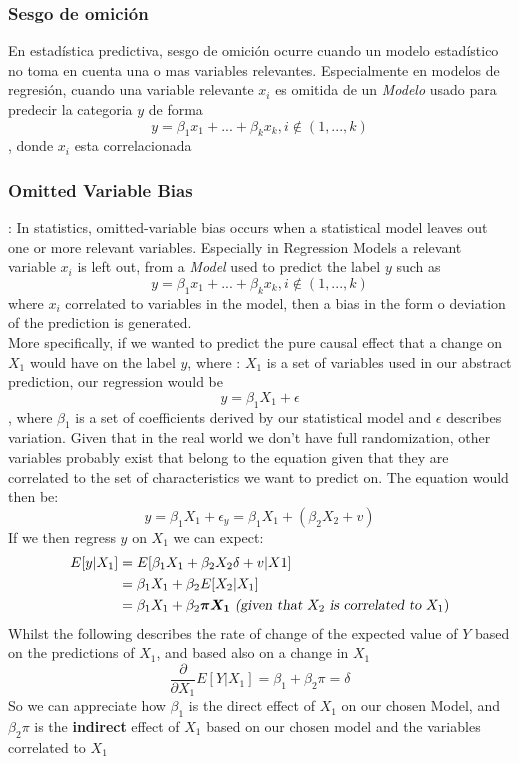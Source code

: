 \subsubsection{Sesgo de omición}
En estadística predictiva, sesgo de omición ocurre cuando un modelo estadístico no toma en cuenta una o mas variables relevantes. Especialmente en modelos de regresión, cuando una variable relevante $x_i$ es omitida de un \textsl{Modelo} usado para predecir la categoria $y$ de forma $$y = \beta_1 x_1 + ... +\beta_k x_k, i\notin (1,...,k) $$, donde $x_i$ esta correlacionada
\subsubsection{Omitted Variable Bias}:
In statistics, omitted-variable bias occurs when a statistical model leaves out one or more relevant variables. Especially in Regression Models a relevant variable $x_i$ is left out, from a \textsl{Model} used to predict the label $y$ such as $$y = \beta_1 x_1 + ... +\beta_k x_k, i\notin (1,...,k) $$ where $x_i$ correlated to variables in the model, then a bias in the form o deviation of the prediction is generated.\\
More specifically, if we wanted to predict the pure causal effect that a change on $X_1$ would have on the label $y$, where : $X_1$ is a set of variables used in our abstract prediction, our  regression would be $$y = \beta_1X_1 + \epsilon$$, where $\beta_1$ is a set of coefficients derived by our statistical model and $\epsilon$ describes variation. Given that in the real world we don't have full randomization, other variables probably exist that belong to the equation given that they are correlated to the set of characteristics we want to predict on. The equation would then be: $$y = \beta_1X_1 + \epsilon_y = \beta_1X_1 + (\beta_2X_2 + v)$$ If we then regress $y$ on $X_1$ we can expect:
\begin{align*}
  E[y|X_1] & = E[\beta_1X_1 + \beta_2X_2\delta+v | X1] \\
  &= \beta_1X_1 + \beta_2E[X_2|X_1] \\
  &= \beta_1X_1 + \beta_2\boldsymbol{\pi X_1}\textsl{ (given that } X_2 \textsl{ is correlated to } X_1)
\end{align*}
Whilst the following describes the rate of change of the expected value of $Y$ based on the predictions of $X_1$, and based also on a change in $X_1$
$$\frac{\partial}{\partial X_1}E[Y|X_1] = \beta_1 + \beta_2 \pi = \delta$$
So we can appreciate how $\beta_1$ is the direct effect of $X_1$ on our chosen Model, and $\beta_2 \pi$ is the \textbf{indirect} effect of $X_1$ based on our chosen model and the variables correlated to $X_1$
